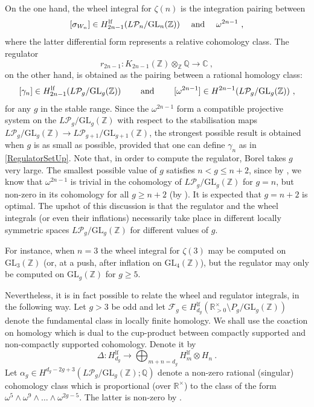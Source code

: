 \documentclass[10pt]{amsart}
\newcommand{\CC}{{\mathbb C}}
\newcommand{\QQ}{{\mathbb Q}}
\newcommand{\RR}{{\mathbb R}}
\newcommand{\ZZ}{{\mathbb Z}}
\theoremstyle{plain}
\newcommand{\GL}{\mathrm{GL}}
\newcommand{\To}{\longrightarrow}
\newcommand{\lf}{\mathrm{lf}}
\newcommand{\0}{\color{blue}{\mathsf{0}}}
\begin{document}
On the one hand, the wheel integral  for $\zeta(n)$   is the integration pairing between 
\begin{equation} \label{WheelSetUp}
[\sigma_{W_n}]\in H^{\lf}_{2n-1}(L\mathcal{P}_n/ \GL_n(\ZZ))   \quad \hbox{ and }  \quad  \omega^{2n-1}  \ , 
\end{equation} where the latter differential form represents a relative cohomology class.
 The regulator
\begin{equation} \label{regulator} r_{2n-1}: K_{2n-1}(\ZZ) \otimes_{\ZZ}\QQ \rightarrow \CC \ , 
\end{equation}
on the other hand, is obtained as the  pairing between  a rational homology class:
\begin{equation} \label{RegulatorSetUp} 
[\gamma_n] \in H_{2n-1}^{\lf}(L\mathcal{P}_g/ \GL_g(\ZZ)) \qquad \hbox{ and } \qquad  [\omega^{2n-1}] \in H^{2n-1} (L \mathcal{P}_g/\GL_g(\ZZ))\ , 
\end{equation}
for any $g$ in the stable range.  Since the $\omega^{2n-1}$ form a compatible projective system on the $L \mathcal{P}_g/\GL_g(\ZZ)$ with respect to the  stabilisation maps $L \mathcal{P}_g/\GL_g(\ZZ) \rightarrow L \mathcal{P}_{g+1}/\GL_{g+1}(\ZZ)$, the strongest  possible result is obtained when  $g$  is as small as possible, provided that one can define $\gamma_n$ as in \eqref{RegulatorSetUp}. Note that,   in order to compute the regulator,  Borel takes  $g$ very large. The smallest possible value of $g$ satisfies $n<g\leq n+2$, since by \cite{BismutLott}, we know that $\omega^{2n-1}$ is trivial in the  cohomology of $L \mathcal{P}_g/\GL_g(\ZZ)$ for $g=n$, but non-zero in its cohomology for all $g\geq n+2$ (by \cite{brown2023bordifications}). It is expected that $g=n+2$ is optimal.  
The upshot of this discussion is that the regulator and the wheel integrals  (or even their inflations) necessarily take place in different locally symmetric spaces      $L \mathcal{P}_g/\GL_g(\ZZ) $   for different values of $g$.

For instance, when $n=3$  the wheel integral for $\zeta(3)$ may be computed  on $\GL_3(\ZZ)$ (or, at a push, after  inflation on $\GL_4(\ZZ)$), but the regulator may  only be computed on  $\GL_g(\ZZ)$ for $g\geq 5.$


Nevertheless, it is in fact possible to relate the wheel and regulator integrals, in the following way. Let $g>3$ be odd and let $\mathcal{F}_g \in H^{\lf}_{d_g}( \RR_{>0}^{\times} \setminus P_g / \GL_g(\ZZ))$  denote the fundamental class in locally finite homology. We  shall use the  coaction on homology which is dual to the cup-product between compactly supported and non-compactly supported cohomology. Denote it by  
\[ \Delta:    H^{\lf}_{d_g}  \To  \bigoplus_{m+n= d_g} H^{\lf}_m \otimes H_n \ . \]
Let $\alpha_g \in  H^{d_g-2g+3}(L\mathcal{P}_g/\GL_g(\ZZ);\QQ )$ denote a non-zero rational (singular) cohomology class which is proportional (over $\RR^{\times}$) to the class of the form 
$ \omega^5 \wedge \omega^9 \wedge \ldots \wedge \omega^{2g-5}$. The latter is non-zero  by \cite{brown2023bordifications}.
\end{document}
